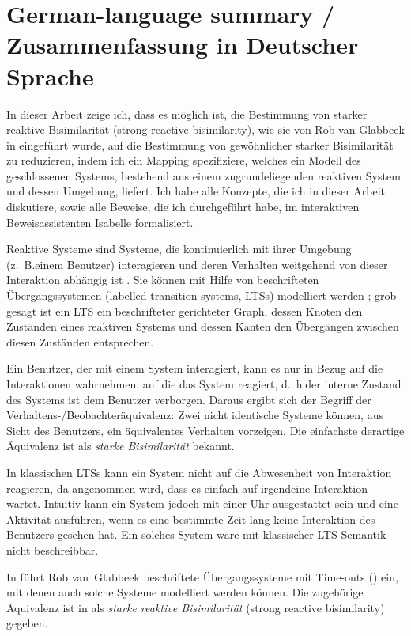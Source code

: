 \chapter*{German-language summary / Zusammenfassung in Deutscher Sprache}

In dieser Arbeit zeige ich, dass es möglich ist, die Bestimmung von starker reaktive Bisimilarität (strong reactive bisimilarity), wie sie von Rob van Glabbeek in \cite{rbs} eingeführt wurde, auf die Bestimmung von gewöhnlicher starker Bisimilarität zu reduzieren, indem ich ein Mapping spezifiziere, welches ein Modell des geschlossenen Systems, bestehend aus einem zugrundeliegenden reaktiven System und dessen Umgebung, liefert. Ich habe alle Kon\-zepte, die ich in dieser Arbeit diskutiere, sowie alle Beweise, die ich durchgeführt habe, im interaktiven Beweisassistenten Isabelle formalisiert.

Reaktive Systeme sind Systeme, die kontinuierlich mit ihrer Umgebung (z.\@~B.\@ einem Benutzer) interagieren und deren Verhalten weitgehend von dieser Interaktion abhängig ist \cite{harel85}.
Sie können mit Hilfe von beschrifteten Übergangssystemen (labelled transition systems, LTSs) modelliert werden \cite{keller76}; grob gesagt ist ein LTS ein beschrifteter gerichteter Graph, dessen Knoten den Zuständen eines reaktiven Systems und dessen Kanten den Übergängen zwischen diesen Zuständen entsprechen.

Ein Benutzer, der mit einem System interagiert, kann es nur in Bezug auf die Interaktionen wahrnehmen, auf die das System reagiert, d.\@~h.\@ der interne Zustand des Systems ist dem Benutzer verborgen. Daraus ergibt sich der Begriff der Verhaltens-/Beobachteräquivalenz: Zwei nicht identische Systeme können, aus Sicht des Benutzers, ein äquivalentes Verhalten vorzeigen. Die einfachste derartige Äquivalenz ist als \emph{starke Bisimilarität} bekannt.

In klassischen LTSs kann ein System nicht auf die Abwesenheit von Interaktion reagieren, da angenommen wird, dass es einfach auf irgendeine Interaktion wartet. Intuitiv kann ein System jedoch mit einer Uhr ausgestattet sein und eine Aktivität ausführen, wenn es eine bestimmte Zeit lang keine Interaktion des Benutzers gesehen hat. Ein solches System wäre mit klassischer LTS-Semantik nicht beschreibbar.

\thispagestyle{empty}
\pagebreak
In \cite{vanglabbeek2021failure} führt Rob van~Glabbeek beschriftete Übergangssysteme mit Time-outs (\LTSt{}) ein, mit denen auch solche Systeme modelliert werden können.
Die zugehörige Äquivalenz ist in \cite{rbs} als \emph{starke reaktive Bisimilarität} (strong reactive bisimilarity) gegeben.

